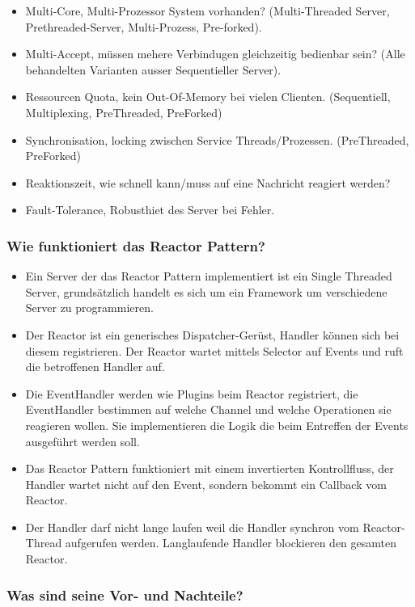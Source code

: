 \documentclass[10pt,a4paper]{scrartcl}
\begin{document}
\begin{itemize}
	\item Multi-Core, Multi-Prozessor System vorhanden? (Multi-Threaded Server, Prethreaded-Server,
		Multi-Prozess, Pre-forked).
	\item Multi-Accept, müssen mehere Verbindugen gleichzeitig bedienbar sein? (Alle behandelten
		Varianten ausser Sequentieller Server).
	\item Ressourcen Quota, kein Out-Of-Memory bei vielen Clienten. (Sequentiell, Multiplexing,
		PreThreaded, PreForked)
	\item Synchronisation, locking zwischen Service Threads/Prozessen. (PreThreaded, PreForked)
	\item Reaktionszeit, wie schnell kann/muss auf eine Nachricht reagiert werden?
	\item Fault-Tolerance, Robusthiet des Server bei Fehler.
\end{itemize}

\subsubsection{Wie funktioniert das Reactor Pattern?}

\begin{itemize}
	\item Ein Server der das Reactor Pattern implementiert ist ein Single Threaded Server,
		grundsätzlich handelt es sich um ein Framework um verschiedene Server zu programmieren.
	\item Der Reactor ist ein generisches Dispatcher-Gerüst, Handler können sich bei diesem
		registrieren. Der Reactor wartet mittels Selector auf Events und ruft die betroffenen Handler
		auf.
	\item Die EventHandler werden wie Plugins beim Reactor registriert, die EventHandler bestimmen auf
		welche Channel und welche Operationen sie reagieren wollen. Sie implementieren die Logik die beim
		Entreffen der Events ausgeführt werden soll.
	\item Das Reactor Pattern funktioniert mit einem invertierten Kontrollfluss, der Handler wartet
		nicht auf den Event, sondern bekommt ein Callback vom Reactor.
	\item Der Handler darf nicht lange laufen weil die Handler synchron vom Reactor-Thread aufgerufen
		werden. Langlaufende Handler blockieren den gesamten Reactor.
\end{itemize}

\subsubsection{Was sind seine Vor- und Nachteile?}
\end{document}
